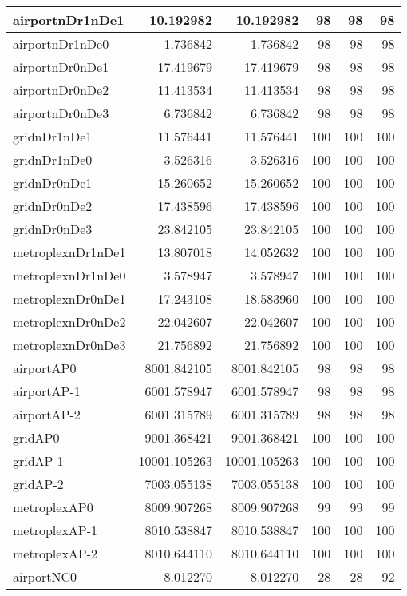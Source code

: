 \begin{longtable}{|l|r|r|r|r|r|}
\endlastfoot
airportnDr1nDe1 & 10.192982 & 10.192982 & 98 & 98 & 98 \\ \hline
airportnDr1nDe0 & 1.736842 & 1.736842 & 98 & 98 & 98 \\ \hline
airportnDr0nDe1 & 17.419679 & 17.419679 & 98 & 98 & 98 \\ \hline
airportnDr0nDe2 & 11.413534 & 11.413534 & 98 & 98 & 98 \\ \hline
airportnDr0nDe3 & 6.736842 & 6.736842 & 98 & 98 & 98 \\ \hline
gridnDr1nDe1 & 11.576441 & 11.576441 & 100 & 100 & 100 \\ \hline
gridnDr1nDe0 & 3.526316 & 3.526316 & 100 & 100 & 100 \\ \hline
gridnDr0nDe1 & 15.260652 & 15.260652 & 100 & 100 & 100 \\ \hline
gridnDr0nDe2 & 17.438596 & 17.438596 & 100 & 100 & 100 \\ \hline
gridnDr0nDe3 & 23.842105 & 23.842105 & 100 & 100 & 100 \\ \hline
metroplexnDr1nDe1 & 13.807018 & 14.052632 & 100 & 100 & 100 \\ \hline
metroplexnDr1nDe0 & 3.578947 & 3.578947 & 100 & 100 & 100 \\ \hline
metroplexnDr0nDe1 & 17.243108 & 18.583960 & 100 & 100 & 100 \\ \hline
metroplexnDr0nDe2 & 22.042607 & 22.042607 & 100 & 100 & 100 \\ \hline
metroplexnDr0nDe3 & 21.756892 & 21.756892 & 100 & 100 & 100 \\ \hline
airportAP0 & 8001.842105 & 8001.842105 & 98 & 98 & 98 \\ \hline
airportAP-1 & 6001.578947 & 6001.578947 & 98 & 98 & 98 \\ \hline
airportAP-2 & 6001.315789 & 6001.315789 & 98 & 98 & 98 \\ \hline
gridAP0 & 9001.368421 & 9001.368421 & 100 & 100 & 100 \\ \hline
gridAP-1 & 10001.105263 & 10001.105263 & 100 & 100 & 100 \\ \hline
gridAP-2 & 7003.055138 & 7003.055138 & 100 & 100 & 100 \\ \hline
metroplexAP0 & 8009.907268 & 8009.907268 & 99 & 99 & 99 \\ \hline
metroplexAP-1 & 8010.538847 & 8010.538847 & 100 & 100 & 100 \\ \hline
metroplexAP-2 & 8010.644110 & 8010.644110 & 100 & 100 & 100 \\ \hline
airportNC0 & 8.012270 & 8.012270 & 28 & 28 & 92 \\ \hline

\end{longtable}
